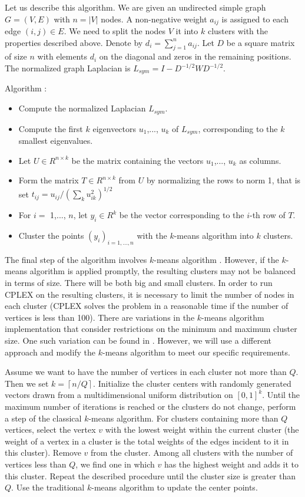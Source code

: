 \documentclass[runningheads]{llncs}
\newcommand{\ceil}[1]{\left\lceil #1 \right\rceil}
\begin{document}
Let us describe this algorithm. We are given an undirected simple graph $G = (V, E)$ with $n=|V|$ nodes. A non-negative weight $a_{ij}$ is assigned to each edge $(i, j) \in E$. We need to split the nodes $V$ it into $k$ clusters with the properties described above. Denote by $d_{i} = \sum_{j=1}^{n} a_{ij}$. Let $D$ be a square matrix of size $n$ with elements $d_{i}$ on the diagonal and zeros in the remaining positions. The normalized graph Laplacian is $L_{sym} = I - D^{-1/2}WD^{-1/2}$.

Algorithm \cite{Luxburg:06}:
\begin{itemize}[itemsep=1em]
    \item Compute the normalized Laplacian $L_{sym}$.
    \item Compute the first $k$ eigenvectors $u_{1}$,..., $u_{k}$ of $L_{sym}$, corresponding to the $k$ smallest eigenvalues.
    \item Let $U \in R^{n \times k}$ be the matrix containing the vectors $u_{1}$,..., $u_{k}$ as columns.
    \item Form the matrix $T \in R^{n \times k}$
    from $U$ by normalizing the rows to norm 1,
    that is set $t_{ij} = u_{ij} / (\sum_{k}^{} u_{ik}^{2}) ^ {1/2}$
    \item For $i =$ 1,..., $n$, let $y_{i} \in R^{k}$ be the vector corresponding to the $i$-th row of $T$.
    \item Cluster the points $(y_{i})_{i=1,...,n}$ with the $k$-means algorithm into $k$ clusters.
\end{itemize}

The final step of the algorithm involves $k$-means algorithm \cite{MacQueen:67}. However, if the $k$-means algorithm is applied promptly, the resulting clusters may not be balanced in terms of size. There will be both big and small clusters. In order to run CPLEX on the resulting clusters, it is necessary to limit the number of nodes in each cluster (CPLEX solves the problem in a reasonable time if the number of vertices is less than 100). There are variations in the $k$-means algorithm implementation that consider restrictions on the minimum and maximum cluster size. One such variation can be found in \cite{Bradley:00}. However, we will use a different approach and modify the $k$-means algorithm to meet our specific requirements.

Assume we want to have the number of vertices in each cluster not more than $Q$. Then we set $k = \ceil{n / Q}$. Initialize the cluster centers with randomly generated vectors drawn from a multidimensional uniform distribution on $[0, 1]^{k}$. Until the maximum number of iterations is reached or the clusters do not change, perform a step of the classical $k$-means algorithm. For clusters containing more than $Q$ vertices, select the vertex $v$ with the lowest weight within the current cluster (the weight of a vertex in a cluster is the total weights of the edges incident to it in this cluster). Remove $v$ from the cluster. Among all clusters with the number of vertices less than $Q$, we find one in which $v$ has the highest weight and adds it to this cluster. Repeat the described procedure until the cluster size is greater than $Q$. Use the traditional $k$-means algorithm to update the center points.
\end{document}
